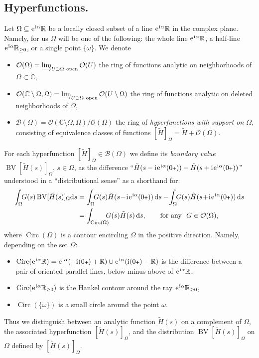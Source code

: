 \documentclass[a4paper,11pt]{amsart}
\numberwithin{equation}{section}
\newcommand{\C}{{\mathbb C}}
\newcommand{\R}{{\mathbb R}}
\newcommand{\Cal}{\mathcal}
\newcommand{\sminus}{\setminus} %
\renewcommand{\i}{\mathrm{i}\mkern.25\thinmuskip}
\renewcommand{\d}{\ensuremath{\operatorname{d}\!}}
\newcommand{\e}{\ensuremath{\mkern.25\thinmuskip\mathrm{e}\mkern.4\thinmuskip}}
\newcommand{\BV}{\operatorname{BV}}
\newcommand{\Circ}{\operatorname{Circ}}
\newcommand{\pls}{{\scalebox{0.7}{$\pmb{+}$}}}
\theoremstyle{definition}
\begin{document}
\subsection{Hyperfunctions.}
Let $\Omega\subseteq \e^{\i\alpha}\R$ be a locally closed subset of a line $\e^{\i\alpha}\R$ in the complex plane. Namely, for us $\Omega$ will be one of the following: the whole line $\e^{\i\alpha}\R$, a half-line $\e^{\i\alpha}\R_{\geq 0}$, or a single point $\{\omega\}$.  
We denote
\begin{itemize}[wide=0pt, leftmargin=\parindent]
	\item $\Cal O(\Omega)=\varinjlim_{U\supset\Omega\ \text{open}}\Cal O(U)$ the ring of functions analytic on neighborhoods of $\Omega\subset\C$,
	\item $\Cal O(\C\sminus\Omega,\Omega)=\varinjlim_{U\supset\Omega\ \text{open}}\Cal O(U\sminus\Omega)$ the ring of functions 
	 analytic on deleted neighborhoods of $\Omega$,
	\item $\Cal B(\Omega)=\Cal O(\C\sminus\Omega,\Omega)\big/\Cal O(\Omega)$ the ring of \emph{hyperfunctions with support on $\Omega$}, consisting 
	 of equivalence classes of functions $[\tilde H]_\Omega=\tilde H + \Cal O(\Omega)$.
\end{itemize}
For each hyperfunction $[\tilde H]_\Omega\in \Cal B(\Omega)$ we define its \emph{boundary value} $\BV[\tilde H(s)]_\Omega$, $s\in\Omega$, as the difference 
``$\tilde H(s-\i \e^{\i\alpha}(0\pls))-\tilde H(s+\i \e^{\i\alpha}(0\pls) )$'' understood in a ``distributional sense'' as a shorthand for:
\begin{align*}\label{eq:dai}
\int_\Omega\!\! G(s)\BV[\tilde H(s)]_\Omega\! \d s&=
\int_\Omega\!\! G(s)\tilde H(s\!-\!\i \e^{\i\alpha}(0\pls))\d s- \!\int_\Omega\!\! G(s)\tilde H(s\!+\!\i \e^{\i\alpha}(0\pls))\d s\\
&=\int_{\Circ(\Omega)}\!\!\!\! G(s)\tilde H(s)\d s,\qquad 	\text{for any } \ G\in \Cal O(\Omega),\nonumber
\end{align*}
where $\Circ(\Omega)$ is a contour encircling $\Omega$ in the positive direction. Namely, depending on the set $\Omega$:
\begin{itemize}[wide=0pt, leftmargin=\parindent]
	\item $\Circ(\e^{\i\alpha}\R)=\e^{\i\alpha}(-\i (0\pls)+\R)\cup \e^{\i\alpha}(\i(0\pls)-\R)$ is the difference between a pair of oriented parallel lines,  below minus above of $\e^{\i\alpha}\R$, 
	\item $\Circ(\e^{\i\alpha}\R_{\geq 0})$ is the Hankel contour around the ray $\e^{\i\alpha}\R_{\geq 0}$,
	\item $\Circ(\{\omega\})$ is a small circle around the point $\omega$.
\end{itemize}
Thus we distinguish between an analytic function $\tilde H(s)$ on a complement of $\Omega$, the associated hyperfunction $[\tilde H(s)]_\Omega$, and the distribution $\BV[\tilde H(s)]_\Omega$ on $\Omega$ defined by $[\tilde H(s)]_\Omega$.
\end{document}
